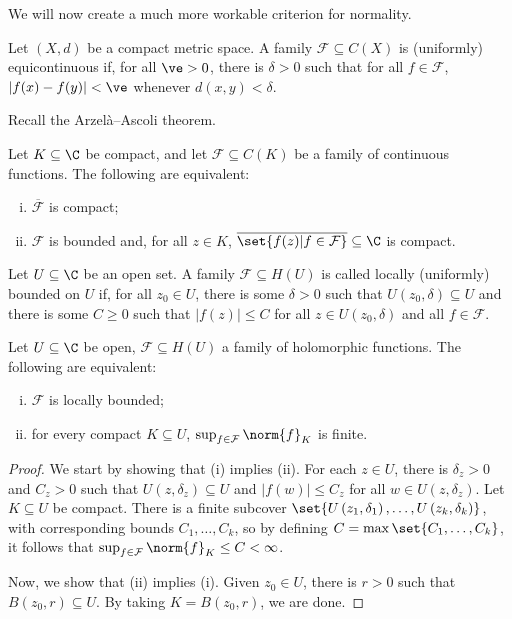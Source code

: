 \documentclass[10pt]{mypackage}
\begin{document}
We will now create a much more workable criterion for normality.
\begin{definition}
  Let $\left( X,d \right)$ be a compact metric space. A family $\mathcal{F}\subseteq C(X)$ is (uniformly) equicontinuous if, for all $\ve > 0$, there is $\delta > 0$ such that for all $f\in \mathcal{F}$, $ \left\vert f(x) - f(y) \right\vert < \ve $ whenever $d\left( x,y \right) < \delta$.
\end{definition}
Recall the Arzelà--Ascoli theorem.
\begin{theorem}
  Let $K\subseteq \C$ be compact, and let $\mathcal{F}\subseteq C(K)$ be a family of continuous functions. The following are equivalent:
  \begin{enumerate}[(i)]
    \item $ \overline{\mathcal{F}} $ is compact;
    \item $\mathcal{F}$ is bounded and, for all $z\in K$, $ \overline{\set{f(z) | f\in \mathcal{F}}} \subseteq \C$ is compact.
  \end{enumerate}
\end{theorem}
\begin{definition}
  Let $U\subseteq \C$ be an open set. A family $\mathcal{F}\subseteq H(U)$ is called locally (uniformly) bounded on $U$ if, for all $z_0\in U$, there is some $\delta > 0$ such that $U\left( z_0,\delta \right)\subseteq U$ and there is some $C \geq 0$ such that $\left\vert f(z) \right\vert\leq C$ for all $z\in U\left( z_0,\delta \right)$ and all $f\in \mathcal{F}$.
\end{definition}
\begin{proposition}
  Let $U\subseteq \C$ be open, $\mathcal{F}\subseteq H(U)$ a family of holomorphic functions. The following are equivalent:
  \begin{enumerate}[(i)]
    \item $\mathcal{F}$ is locally bounded;
    \item for every compact $K\subseteq U$, $\sup_{f\in \mathcal{F}}\norm{f}_{K}$ is finite.
  \end{enumerate}
\end{proposition}
\begin{proof}
  We start by showing that (i) implies (ii). For each $z\in U$, there is $\delta_z > 0$ and $C_z > 0$ such that $U\left( z,\delta_z \right)\subseteq U$ and $\left\vert f(w) \right\vert\leq C_z$ for all $w\in U\left( z,\delta_z \right)$. Let $K\subseteq U$ be compact. There is a finite subcover $\set{U\left( z_1,\delta_1 \right),\dots,U\left( z_k,\delta_k \right)}$, with corresponding bounds $C_1,\dots,C_k$, so by defining $C = \max\set{C_{1},\dots,C_k}$, it follows that $\sup_{f\in \mathcal{F}}\norm{f}_K\leq C < \infty$.%

  Now, we show that (ii) implies (i). Given $z_0\in U$, there is $r > 0$ such that $B\left( z_0,r \right)\subseteq U$. By taking $K = B\left( z_0,r \right)$, we are done.
\end{proof}
\end{document}
